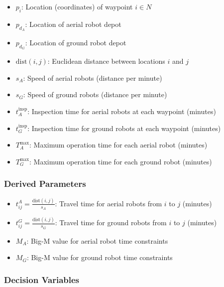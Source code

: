\documentclass{article}
\begin{document}
				\begin{itemize}
				\item $p_i$: Location (coordinates) of waypoint $i \in N$
				\item $p_{d_A}$: Location of aerial robot depot
				\item $p_{d_G}$: Location of ground robot depot
				\item $\text{dist}(i,j)$: Euclidean distance between locations $i$ and $j$
				\item $s_A$: Speed of aerial robots (distance per minute)
				\item $s_G$: Speed of ground robots (distance per minute)
				\item $t_A^{\text{insp}}$: Inspection time for aerial robots at each waypoint (minutes)
				\item $t_G^{\text{insp}}$: Inspection time for ground robots at each waypoint (minutes)
				\item $T_A^{\max}$: Maximum operation time for each aerial robot (minutes)
				\item $T_G^{\max}$: Maximum operation time for each ground robot (minutes)
				\end{itemize}

			\subsubsection{Derived Parameters}

				\begin{itemize}
				\item $t_{ij}^{A} = \frac{\text{dist}(i,j)}{s_A}$: Travel time for aerial robots from $i$ to $j$ (minutes)
				\item $t_{ij}^{G} = \frac{\text{dist}(i,j)}{s_G}$: Travel time for ground robots from $i$ to $j$ (minutes)
				\item $M_A$: Big-M value for aerial robot time constraints
				\item $M_G$: Big-M value for ground robot time constraints
				\end{itemize}

			\subsubsection{Decision Variables}
\end{document}
